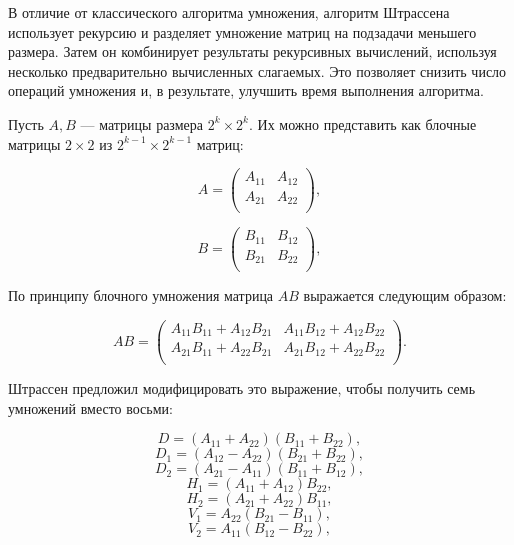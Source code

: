 В отличие от классического алгоритма умножения, алгоритм Штрассена использует рекурсию и разделяет умножение матриц на подзадачи меньшего размера. Затем он комбинирует результаты рекурсивных вычислений, используя несколько предварительно вычисленных слагаемых. Это позволяет снизить число операций умножения и, в результате, улучшить время выполнения алгоритма.

Пусть $A, B$ --- матрицы размера $2^k \times 2^k$. Их можно представить как блочные матрицы $2 \times 2$ из $2^{k-1} \times 2^{k-1}$ матриц:

\begin{equation}
	A = \left(
	\begin{array}{cc}
		A_{11} & A_{12} \\
		A_{21} & A_{22} \\
	\end{array}
	\right),
\end{equation}

\begin{equation}
	B = \left(
	\begin{array}{cc}
		B_{11} & B_{12} \\
		B_{21} & B_{22} \\
	\end{array}
	\right),
\end{equation}

По принципу блочного умножения матрица $AB$ выражается следующим образом:

\begin{equation}
	AB = \left(
	\begin{array}{cc}
		A_{11}B_{11} + A_{12}B_{21} & A_{11}B_{12} + A_{12}B_{22}\\
		A_{21}B_{11} + A_{22}B_{21} & A_{21}B_{12} + A_{22}B_{22} \\
	\end{array}
	\right).
\end{equation}

Штрассен предложил модифицировать это выражение, чтобы получить семь умножений вместо восьми:

\begin{equation}D = (A_{11} + A_{22})(B_{11} + B_{22}),\end{equation}
\begin{equation}D_1 = (A_{12} - A_{22})(B_{21} + B_{22}),\end{equation}
\begin{equation}D_2 = (A_{21} - A_{11})(B_{11} + B_{12}),\end{equation}
\begin{equation}H_1 = (A_{11} + A_{12})B_{22},\end{equation}
\begin{equation}H_2 = (A_{21} + A_{22})B_{11},\end{equation}
\begin{equation}V_1 = A_{22}(B_{21} - B_{11}),\end{equation}
\begin{equation}V_2 = A_{11}(B_{12} - B_{22}),\end{equation}

